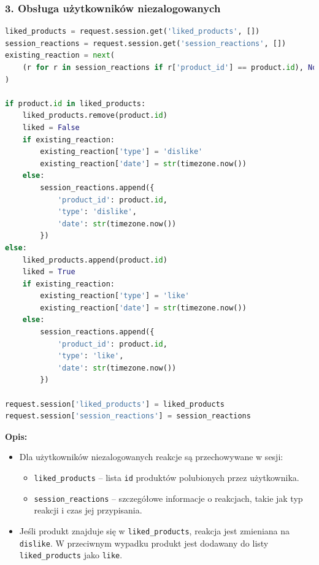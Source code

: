 \documentclass[12pt,a4paper,oneside]{article}
\theoremstyle{definition}
\numberwithin{equation}{section}
\begin{document}
\subsubsection*{3. Obsługa użytkowników niezalogowanych}
\begin{lstlisting}[language=Python, caption=Fragment kodu: Obsługa użytkowników niezalogowanych]
liked_products = request.session.get('liked_products', [])
session_reactions = request.session.get('session_reactions', [])
existing_reaction = next(
    (r for r in session_reactions if r['product_id'] == product.id), None
)

if product.id in liked_products:
    liked_products.remove(product.id)
    liked = False
    if existing_reaction:
        existing_reaction['type'] = 'dislike'
        existing_reaction['date'] = str(timezone.now())
    else:
        session_reactions.append({
            'product_id': product.id,
            'type': 'dislike',
            'date': str(timezone.now())
        })
else:
    liked_products.append(product.id)
    liked = True
    if existing_reaction:
        existing_reaction['type'] = 'like'
        existing_reaction['date'] = str(timezone.now())
    else:
        session_reactions.append({
            'product_id': product.id,
            'type': 'like',
            'date': str(timezone.now())
        })

request.session['liked_products'] = liked_products
request.session['session_reactions'] = session_reactions
\end{lstlisting}
\textbf{Opis:}
\begin{itemize}
    \item Dla użytkowników niezalogowanych reakcje są przechowywane w sesji:
    \begin{itemize}
        \item \texttt{liked\_products} – lista \texttt{id} produktów polubionych przez użytkownika.
        \item \texttt{session\_reactions} – szczegółowe informacje o reakcjach, takie jak typ reakcji i czas jej przypisania.
    \end{itemize}
    \item Jeśli produkt znajduje się w \texttt{liked\_products}, reakcja jest zmieniana na \texttt{dislike}. W przeciwnym wypadku produkt jest dodawany do listy \texttt{liked\_products} jako \texttt{like}.
\end{itemize}
\end{document}
